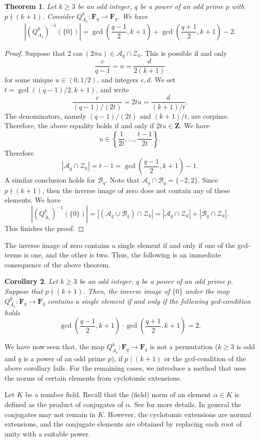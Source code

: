\documentclass{amsart}
\newcommand{\mc}{\mathcal}
\newcommand{\Z}{\mathbf Z}
\newcommand{\F}{\mathbf F}
\numberwithin{equation}{section}
\theoremstyle{plain}
\newtheorem{theorem}{Theorem}
\newtheorem{corollary}[theorem]{Corollary}
\theoremstyle{definition}
\begin{document}
\begin{theorem}\label{thm:invimageofzero}
Let $k \ge 3$ be an odd integer, $q$ be a power of an odd prime $p$ with $p \nmid (k+1)$. Consider $Q_{A_{1}}^{k} : \F_{q} \to \F_{q}$. We have
$$
|(Q_{A_{1}}^{k})^{-1}(\{0\})| = \gcd\left(\frac{q-1}{2}, k+1\right) + \gcd\left(\frac{q+1}{2}, k+1\right) - 2.
$$
\end{theorem}
\begin{proof} Suppose that $2\cos(2\pi u) \in \mc{A}_{q} \cap \mc{Z}_{k}$. This is possible if and only
\[\frac{c}{q-1} = u = \frac{d}{2(k+1)}\]
for some unique $u \in (0,1/2)$, and integers $c,d$. We set $t = \gcd\left((q-1)/2, k+1\right)$, and write
\[\frac{c}{(q-1)/(2t)} = 2tu = \frac{d}{(k+1)/t}.\]
The denominators, namely  $(q-1)/(2t)$ and $(k+1)/t$, are corpime. Therefore, the above equality holds if and only if $2tu \in \Z$. We have 
$$u \in \left\{ \dfrac{1}{2t}, \dots, \dfrac{t-1}{2t}\right\}.$$ 
Therefore 
$$|\mc{A}_{q} \cap \mc{Z}_{k}| = t-1 = \gcd\left(\frac{q-1}{2}, k+1\right) - 1.$$
A similar conclusion holds for $\mc{B}_{q}$. Note that $\mc{A}_{q} \cap \mc{B}_{q} =\{-2,2\}$. Since $p \nmid (k+1)$, then the inverse image of zero does not contain any of these elements. We have 
\[|(Q_{A_{1}}^{k})^{-1}(\{0\})|= |(\mc{A}_{q} \cup \mc{B}_{q}) \cap \mc{Z}_{k}| = |\mc{A}_{q} \cap \mc{Z}_{k}| + |\mc{B}_{q} \cap \mc{Z}_{k}|.\]
This finishes the proof.
\end{proof}

The inverse image of zero contains a single element if and only if one of the gcd-terms is one, and the other is two. Thus, the following is an immediate consequence of the above theorem.
\begin{corollary}\label{cor:A1invzero}
Let $k \ge 3$ be an odd integer, $q$ be a power of an odd prime $p$. Suppose that $p \nmid (k+1)$. Then, the inverse image of $\{0\}$ under the map $Q_{A_{1}}^{k}:\F_{q} \to \F_{q}$ contains a single element if and only if the following gcd-condition holds 
	$$
	\gcd\left(\frac{q-1}{2}, k+1\right) \cdot \gcd\left(\frac{q+1}{2}, k+1\right) = 2.
	$$
\end{corollary}
We have now seen that, the map $Q^k_{A_1}:\F_q\rightarrow\F_q$ is not a permutation ($k\ge 3$ is odd and $q$ is a power of an odd prime $p$), if $p\mid(k+1)$ or the gcd-condition of the above corollary fails. For the remaining cases, we introduce a method that uses the norms of certain elements from cyclotomic extensions. 


Let $K$ be a number field. Recall that the (field) norm of an element $\alpha \in K$ is defined as the product of conjugates of $\alpha$. See \cite{marcus2018} for more details. In general the conjugates may not remain in $K$. However, the cyclotomic extensions are normal extensions, and the conjugate elements are obtained by replacing each root of unity with a suitable power.
\end{document}
